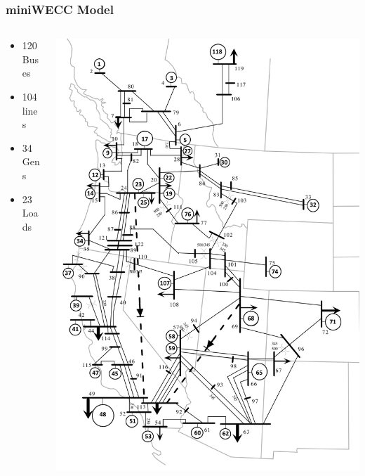 \documentclass[14pt, unknownkeysallowed]{beamer}
\begin{document}
\begin{frame}
\frametitle{miniWECC Model}
\begin{columns}
\begin{column}{0.45\textwidth}
   \begin{itemize}
\item 120 Buses
\item 104 lines
\item 34 Gens
\item 23 Loads
\end{itemize}
\end{column}
\begin{column}{.5\textwidth}
\includegraphics[height=.8\textheight]{miniWECCpres} %
\end{column}
\end{columns}
\end{frame}
\end{document}
